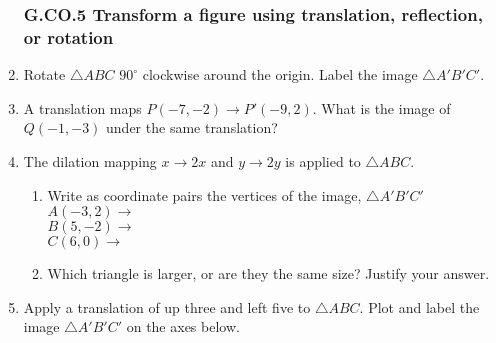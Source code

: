\documentclass[12pt, twoside]{article}
\begin{document}
\begin{enumerate}[itemsep=0.5cm]
\newpage
\subsubsection*{G.CO.5 Transform a figure using translation, reflection, or rotation}
\item  Rotate $\triangle ABC$ $90^\circ$ clockwise around the origin. Label the image $\triangle A'B'C'$.
    \begin{center}
      \end{center}
  
\item A translation maps $P(-7,-2) \rightarrow P'(-9,2)$. What is the image of $Q(-1,-3)$ under the same translation? \vspace{1cm}
      
\item The dilation mapping $x \rightarrow 2x$ and $y \rightarrow 2y$ is applied to $\triangle ABC$.
  \begin{enumerate}
    \item Write as coordinate pairs the vertices of the image, $\triangle A'B'C'$ \\[0.3cm]
    $A(-3,2) \rightarrow$ \\[0.7cm]
    $B(5,-2) \rightarrow$ \\[0.7cm]
    $C(6,0) \rightarrow$ \\[0.1cm]
    \item Which triangle is larger, or are they the same size? Justify your answer.
  \end{enumerate} \vspace{2cm}

\newpage
\item Apply a translation of up three and left five to $\triangle ABC$. Plot and label the image $\triangle A'B'C'$ on the axes below.
  \begin{center}
  \end{center}


\end{enumerate}
\end{document}
